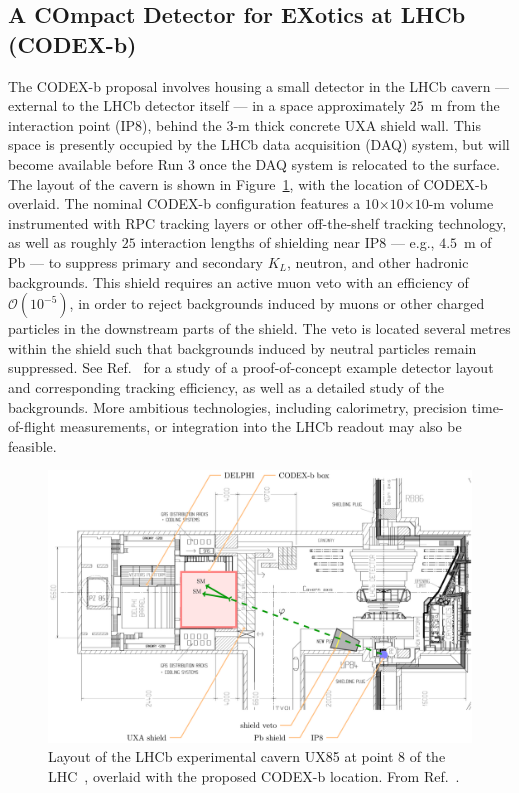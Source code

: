 \subsection{A COmpact Detector for EXotics at LHCb (CODEX-b)}
\label{sec:CODEX-b}

The CODEX-b proposal involves housing a small detector in the LHCb cavern --- external to the LHCb detector itself --- in a space approximately $25$~m from the interaction point (IP8), behind the 3-m thick concrete UXA shield wall. This space is presently occupied by the LHCb data acquisition (DAQ) system, but will become available before Run 3 once the DAQ system is relocated to the surface. The layout of the cavern is shown in Figure~\ref{fig:LHCbCav}, with the location of CODEX-b overlaid. The nominal CODEX-b configuration features a $10$$\times10$$\times10$-m volume instrumented with RPC tracking layers or other off-the-shelf tracking technology, as well as roughly $25$ interaction lengths of shielding near IP8 --- e.g., $4.5$~m of Pb --- to suppress primary and secondary $K_L$, neutron, and other hadronic backgrounds. This shield requires an active muon veto with an efficiency of $\mathcal{O}(10^{-5})$, in order to reject backgrounds induced by muons or other charged particles in the downstream parts of the shield. The veto is located several metres within the shield such that backgrounds induced by neutral particles remain suppressed. See Ref.~\cite{Gligorov:2017nwh} for a study of a proof-of-concept example detector layout and corresponding tracking efficiency, as well as a detailed study of the backgrounds. More ambitious technologies, including calorimetry, precision time-of-flight measurements, or integration into the LHCb readout may also be feasible.

\begin{figure}[th]\centering
	\includegraphics[width = 0.8\linewidth]{plots/LHCbCavern}
	\caption{Layout of the LHCb experimental cavern UX85 at point 8 of the LHC~\cite{cavern}, overlaid with the proposed CODEX-b location. From Ref.~\cite{Gligorov:2017nwh}. }
	\label{fig:LHCbCav}
\end{figure}

